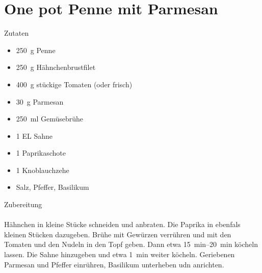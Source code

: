 \section*{One pot Penne mit Parmesan}
\ihead{}\ohead{}
\cfoot{}
{\Large Zutaten}
\begin{multicols}{2}
\begin{itemize}
    \item \SI{250}{g} Penne
    \item \SI{250}{g} Hähnchenbrustfilet
    \item \SI{400}{g} stückige Tomaten (oder frisch)
    \item \SI{30}{g} Parmesan
    \item \SI{250}{ml} Gemüsebrühe
    \item \num{1} EL Sahne
    \item \num{1} Paprikaschote
    \item \num{1} Knoblauchzehe
    \item Salz, Pfeffer, Basilikum
\end{itemize}
\end{multicols}
\noindent
{\Large Zubereitung}\\
\\
Hähnchen in kleine Stücke schneiden und anbraten.
Die Paprika in ebenfals kleinen Stücken dazugeben.
Brühe mit Gewürzen verrühren und mit den Tomaten und den Nudeln in den Topf geben.
Dann etwa \SIrange{15}{20}{min} köcheln lassen. 
Die Sahne hinzugeben und etwa \SI{1}{min} weiter köcheln. 
Geriebenen Parmesan und Pfeffer einrühren, Basilikum unterheben udn anrichten. 
